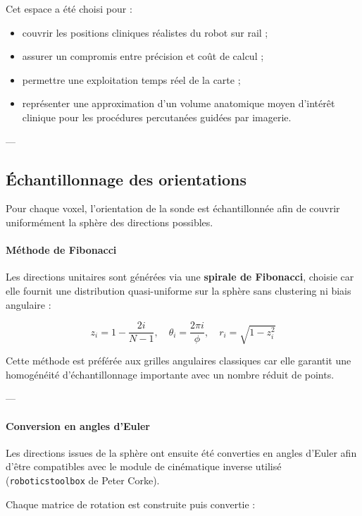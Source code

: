 \documentclass[11pt, a4paper]{article}
\begin{document}
Cet espace a été choisi pour :
\begin{itemize}
  \item couvrir les positions cliniques réalistes du robot sur rail ;
  \item assurer un compromis entre précision et coût de calcul ;
  \item permettre une exploitation temps réel de la carte ;
  \item représenter une approximation d’un volume anatomique moyen d’intérêt clinique pour les procédures percutanées guidées par imagerie.
\end{itemize}

---

\subsection{Échantillonnage des orientations}

Pour chaque voxel, l’orientation de la sonde est échantillonnée afin de couvrir uniformément la sphère des directions possibles.

\paragraph{Méthode de Fibonacci}

Les directions unitaires sont générées via une \textbf{spirale de Fibonacci}, choisie car elle fournit une distribution quasi-uniforme sur la sphère sans clustering ni biais angulaire :

\begin{equation}
z_i = 1 - \frac{2i}{N-1}, \quad
\theta_i = \frac{2\pi i}{\phi}, \quad
r_i = \sqrt{1 - z_i^2}
\end{equation}

Cette méthode est préférée aux grilles angulaires classiques car elle garantit une homogénéité d’échantillonnage importante avec un nombre réduit de points.

---

\paragraph{Conversion en angles d’Euler}

Les directions issues de la sphère ont ensuite été converties en angles d’Euler afin d’être compatibles avec le module de cinématique inverse utilisé (\texttt{roboticstoolbox} de Peter Corke).

Chaque matrice de rotation est construite puis convertie :
\end{document}
